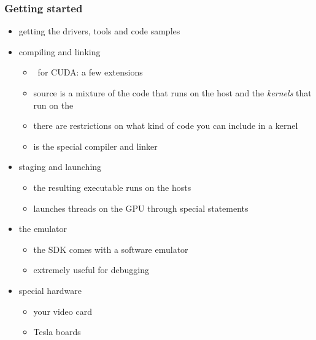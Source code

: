 \begin{frame}[fragile]
%
  \frametitle{Getting started}
%
  \begin{itemize}
%
  \item getting the drivers, tools and code samples
%
  \item compiling and linking
    \begin{itemize}
    \item \cc\ for CUDA: a few extensions
    \item source is a mixture of the code that runs on the host and the {\em kernels} that run
      on the 
    \item there are restrictions on what kind of code you can include in a kernel
    \item {} is the special compiler and linker
    \end{itemize}
%
  \item staging and launching
    \begin{itemize}
    \item the resulting executable runs on the hosts
    \item launches threads on the GPU through special statements
    \end{itemize}
%
  \item the emulator
    \begin{itemize}
    \item the SDK comes with a software emulator
    \item extremely useful for debugging
    \end{itemize}
%
  \item special hardware
    \begin{itemize}
    \item your video card
    \item Tesla boards
    \end{itemize}
%
  \end{itemize}
%
\end{frame}

